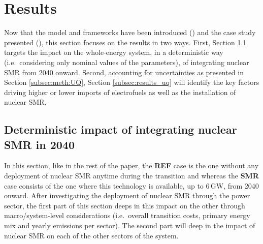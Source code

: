 \documentclass[11pt,twoside,a4paper,english]{article}
\def\ie{i.e.\ }
\begin{document}


\section{Results}
\label{sec:results}
Now that the model and frameworks have been introduced () and the case study presented (), this section focuses on the results in two ways. First, Section \ref{subsec:results_deter} targets the impact on the whole-energy system, in a deterministic way (\ie considering only nominal values of the parameters), of integrating nuclear SMR from 2040 onward. Second, accounting for uncertainties as presented in Section \ref{subsec:meth:UQ}, Section \ref{subsec:results_uq} will identify the key factors driving higher or lower imports of electrofuels as well as the installation of nuclear SMR. 

\subsection{Deterministic impact of integrating nuclear SMR in 2040}
\label{subsec:results_deter} 
In this section, like in the rest of the paper, the \textbf{REF} case is the one without any deployment of nuclear SMR anytime during the transition and whereas the \textbf{SMR} case consists of the one where this technology is available, up to 6\,GW, from 2040 onward. After investigating the deployment of nuclear SMR through the power sector, the first part of this section deeps in this impact on the other through  macro/system-level considerations (\ie overall transition costs, primary energy mix and yearly emissions per sector). The second part will deep in the impact of nuclear SMR on each of the other sectors of the system.
\end{document}

